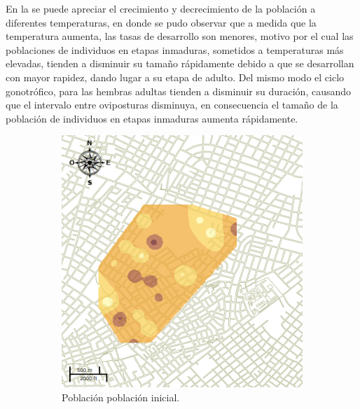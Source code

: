 En la  se puede apreciar el crecimiento y decrecimiento de la población
a diferentes temperaturas, en donde se pudo observar que a medida que la temperatura aumenta, las
tasas de desarrollo son menores, motivo por el cual las poblaciones de individuos en etapas
inmaduras, sometidos a temperaturas más elevadas, tienden a disminuir su tamaño rápidamente debido
a que se desarrollan con mayor rapidez, dando lugar a su etapa de adulto. Del mismo modo el ciclo
gonotrófico, para las hembras adultas tienden a disminuir su duración, causando que el intervalo
entre oviposturas disminuya, en consecuencia el tamaño de la población de individuos en etapas
inmaduras aumenta rápidamente.

\begin{figure}[!t]
    \centering
    \begin{subfigure}[b]{0.225\textwidth}
        \includegraphics[width=\textwidth]{./graphics/inicial.png}
        \caption{ Población población inicial.}
    \end{subfigure}
    ~~~~
    \begin{subfigure}[b]{0.225\textwidth}

\end{subfigure}
\end{figure}
